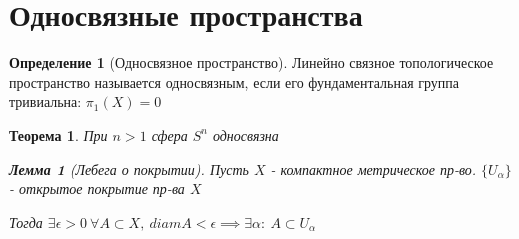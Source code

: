 \documentclass[a4paper]{article}
\newtheorem*{theorem}{Теорема}
\newtheorem*{lemma}{Лемма}
\theoremstyle{definition}
\newtheorem*{definition}{Определение}
\theoremstyle{remark}
\begin{document}
\section{\centering Односвязные пространства}
\begin{tcolorbox}[title=Односвязное пространство]
    \begin{definition}[Односвязное пространство]
        Линейно связное топологическое пространство называется односвязным,
        если его фундаментальная группа тривиальна: $ \pi_1(X) = 0 $ 
    \end{definition}
\end{tcolorbox}

\begin{tcolorbox}
    \begin{theorem}
        При $ n > 1 $ сфера $ S^{n} $ односвязна
        \begin{lemma}[Лебега о покрытии]
            Пусть $ X $ - компактное метрическое пр-во. $ \{ U_{\alpha} \} $ -
            открытое покрытие пр-ва $ X $ 

            Тогда $ \exists \epsilon > 0 \ \forall A \subset X, \ diam A < \epsilon
            \implies \exists \alpha : \ A \subset U_{\alpha}$ 
        \end{lemma}
    \end{theorem}
\end{tcolorbox}
\end{document}
